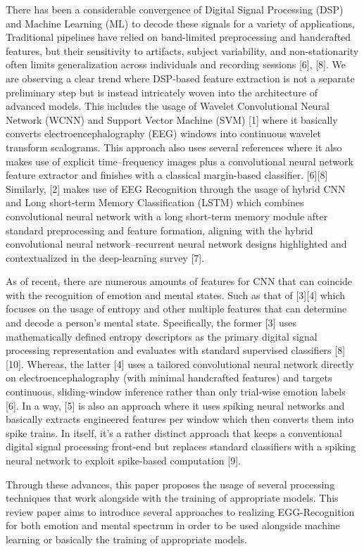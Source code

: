 \documentclass[conference]{IEEEtran}
\begin{document}
There has been a considerable convergence of Digital Signal Processing (DSP) and Machine Learning (ML) to decode these signals for a variety of applications, Traditional pipelines have relied on band-limited preprocessing and handcrafted features, but their sensitivity to artifacts, subject variability, and non-stationarity often limits generalization across individuals and recording sessions [6], [8].
 We are observing a clear trend where DSP-based feature extraction is not a separate preliminary step but is instead intricately woven into the architecture of advanced models. This includes the usage of Wavelet Convolutional Neural Network (WCNN) and Support Vector Machine (SVM) [1] where it basically converts electroencephalography (EEG) windows into continuous wavelet transform scalograms. This approach also uses several references where it also makes use of explicit time–frequency images plus a convolutional neural network feature extractor and finishes with a classical margin-based classifier. [6][8] Similarly, [2] makes use of EEG Recognition through the usage of hybrid CNN and Long short-term Memory Classification (LSTM) which combines convolutional neural network with a long short-term memory module after standard preprocessing and feature formation, aligning with the hybrid convolutional neural network–recurrent neural network designs highlighted and contextualized in the deep-learning survey [7].

 As of recent, there are numerous amounts of features for CNN that can coincide with the recognition of emotion and mental states. Such as that of [3][4] which focuses on the usage of entropy and other multiple features that can determine and decode a person's mental state. Specifically, the former [3] uses mathematically defined entropy descriptors as the primary digital signal processing representation and evaluates with standard supervised classifiers [8][10]. Whereas, the latter [4] uses a tailored convolutional neural network directly on electroencephalography (with minimal handcrafted features) and targets continuous, sliding-window inference rather than only trial-wise emotion labels [6].
 In a way, [5] is also an approach where it uses spiking neural networks and basically extracts engineered features per window which then converts them into spike trains. In itself, it's a rather distinct approach that keeps a conventional digital signal processing front-end but replaces standard classifiers with a spiking neural network to exploit spike-based computation [9].

 Through these advances, this paper proposes the usage of several processing techniques that work alongside with the training of appropriate models. This review paper aims to introduce several approaches to realizing EGG-Recognition for both emotion and mental spectrum in order to be used alongside machine learning or basically the training of appropriate models.
\end{document}
